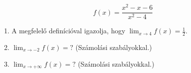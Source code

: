 \documentclass[11pt]{scrartcl}
\begin{document}
\[
	f(x) = \frac{x^2 - x - 6}{x^2 - 4}
\]
\begin{enumerate}
	\item A megfelelő definícióval igazolja, hogy
	      \(\displaystyle \lim_{x \to 4} f(x) = \frac{1}{2}\).

	\item \(\displaystyle \lim_{x \to -2} f(x) = ?\) (Számolási szabályokkal.)

	\item \(\displaystyle \lim_{x \to +\infty} f(x) = ?\) (Számolási
	      szabályokkal.)
\end{enumerate}
\end{document}
